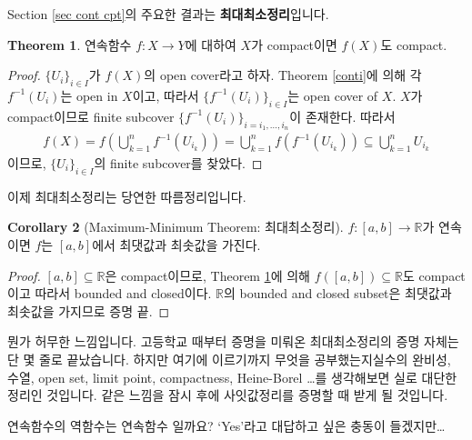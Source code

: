 \documentclass[12pt]{article}
\theoremstyle{definition}
\newtheorem{thm}{Theorem}[section]
\newtheorem{cor}[thm]{Corollary}
\def\RR{\mathbb{R}}
\begin{document}
Section \ref{sec cont cpt}의 주요한 결과는 \textbf{최대최소정리}입니다.

\begin{thm} \label{conticpt}
	연속함수 \(f: X \rightarrow Y\)에 대하여 \(X\)가 compact이면 \(f(X)\)도 compact.
\end{thm}
\begin{proof}
	\(\{U_i\}_{i \in I}\)가 \(f(X)\)의 open cover라고 하자. Theorem \ref{conti}에 의해 각 \(f^{-1}(U_i)\)는 open in \(X\)이고, 따라서 \(\{f^{-1}(U_i)\}_{i \in I}\)는 open cover of \(X\). \(X\)가 compact이므로 finite subcover \(\{f^{-1}(U_i)\}_{i = i_1, \ldots, i_n}\)이 존재한다. 따라서
	\begin{gather*}
		f(X) = f(\bigcup_{k = 1}^n f^{-1}(U_{i_k})) = \bigcup_{k = 1}^n f(f^{-1}(U_{i_k})) \subseteq \bigcup_{k = 1}^n U_{i_k}
	\end{gather*}
	이므로, \(\{U_i\}_{i \in I}\)의 finite subcover를 찾았다.
\end{proof}

이제 최대최소정리는 당연한 따름정리입니다.

\begin{cor} [Maximum-Minimum Theorem: 최대최소정리]
	\(f: [a, b] \rightarrow \RR\)가 연속이면 \(f\)는 \([a, b]\)에서 최댓값과 최솟값을 가진다.
\end{cor}
\begin{proof}
	\([a, b] \subseteq \RR\)은 compact이므로, Theorem \ref{conticpt}에 의해 \(f([a, b]) \subseteq \RR\)도 compact이고 따라서 bounded and closed이다. \(\RR\)의 bounded and closed subset은 최댓값과 최솟값을 가지므로 증명 끝.
\end{proof}

뭔가 허무한 느낌입니다. 고등학교 때부터 증명을 미뤄온 최대최소정리의 증명 자체는 단 몇 줄로 끝났습니다. 하지만 여기에 이르기까지 무엇을 공부했는지\textemdash 실수의 완비성, 수열, open set, limit point, compactness, Heine-Borel \ldots \textemdash 를 생각해보면 실로 대단한 정리인 것입니다. 같은 느낌을 잠시 후에 사잇값정리를 증명할 때 받게 될 것입니다.

연속함수의 역함수는 연속함수 일까요? `Yes'라고 대답하고 싶은 충동이 들겠지만\ldots
\end{document}
